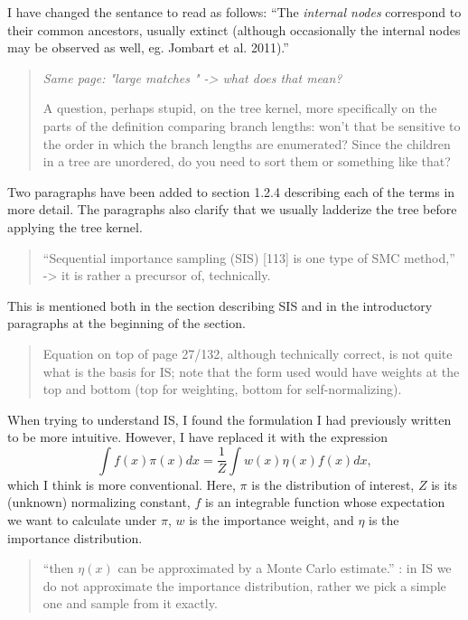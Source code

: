 \documentclass[12pt]{article}
\begin{document}
I have changed the sentance to read as follows: ``The \emph{internal nodes}            
correspond to their common ancestors, usually extinct (although occasionally
the internal nodes may be observed as well, eg. Jombart et al. 2011).''

\begin{quote}
  \itshape
  Same page: "large matches " -> what does that mean?

  A question, perhaps stupid, on the tree kernel, more specifically on the
  parts of the definition comparing branch lengths: won't that be sensitive to
  the order in which the branch lengths are enumerated? Since the children in a
  tree are unordered, do you need to sort them or something like that?
\end{quote}

Two paragraphs have been added to section 1.2.4 describing each of the terms in
more detail. The paragraphs also clarify that we usually ladderize the tree
before applying the tree kernel.

\begin{quote}
  \itshape

  ``Sequential importance sampling (SIS) [113] is one type of SMC method,'' ->
  it is rather a precursor of, technically.
\end{quote}

This is mentioned both in the section describing SIS and in the introductory
paragraphs at the beginning of the section.

\begin{quote}
  \itshape

  Equation on top of page 27/132, although technically correct, is not quite
  what is the basis for IS; note that the form used would have weights at the
  top and bottom (top for weighting, bottom for self-normalizing).
\end{quote}

When trying to understand IS, I found the formulation I had previously written
to be more intuitive. However, I have replaced it with the expression
\[
  \int f(x) \pi(x) dx = \frac{1}{Z} \int w(x) \eta(x) f(x) dx,
\]
which I think is more conventional. Here, $\pi$ is the distribution of interest,
$Z$ is its (unknown) normalizing constant, $f$ is an integrable function whose
expectation we want to calculate under $\pi$, $w$ is the importance weight, and
$\eta$ is the importance distribution.

\begin{quote}
  \itshape

  ``then $\eta(x)$ can be approximated by a Monte Carlo estimate.'' : in IS we
  do not approximate the importance distribution, rather we pick a simple one
  and sample from it exactly.
\end{quote}
\end{document}
